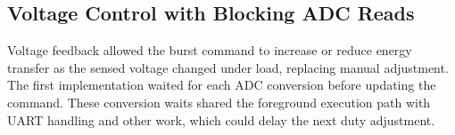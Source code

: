\subsection{Voltage Control with Blocking ADC Reads}
\label{sec:ctrl-v1}

Voltage feedback allowed the burst command to increase or reduce energy transfer as the sensed voltage changed under load, replacing manual adjustment. The first implementation waited for each ADC conversion before updating the command. These conversion waits shared the foreground execution path with UART handling and other work, which could delay the next duty adjustment.
